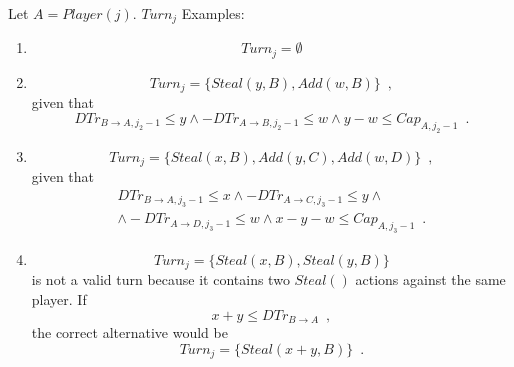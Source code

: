 \documentclass[11pt]{llncs}
\theoremstyle{definition}
\begin{document}
     Let $A = Player(j)$. $Turn_j$ Examples:
     \begin{enumerate}
        \item \begin{equation}
           Turn_j = \emptyset
        \end{equation}
        \item \begin{equation}
           Turn_j = \{Steal\left(y, B\right), Add\left(w, B\right)\} \enspace,
        \end{equation}
        given that
        \begin{equation}
           DTr_{B \rightarrow A, j_2 - 1} \leq y \wedge -DTr_{A \rightarrow B, j_2 - 1} \leq w \wedge y - w \leq
           Cap_{A, j_2-1} \enspace.
        \end{equation}
        \item \begin{equation}
           Turn_j = \{Steal\left(x, B\right), Add\left(y, C\right), Add\left(w, D\right)\} \enspace,
        \end{equation}
        given that
        \begin{equation}
        \begin{gathered}
           DTr_{B \rightarrow A, j_3 - 1} \leq x \wedge -DTr_{A \rightarrow C, j_3-1} \leq y \wedge \\
           \wedge -DTr_{A \rightarrow D, j_3 - 1} \leq w \wedge x - y - w \leq Cap_{A, j_3-1} \enspace.
        \end{gathered}
        \end{equation}
        \item \begin{equation}
           Turn_j = \{Steal\left(x, B\right), Steal\left(y, B\right)\}
        \end{equation}
        is not a valid turn because it contains two $Steal\left(\right)$ actions against the same player. If
        \begin{equation}
           x + y \leq DTr_{B \rightarrow A} \enspace,
        \end{equation}
        the correct alternative would be
        \begin{equation}
           Turn_j = \{Steal\left(x+y, B\right)\} \enspace.
        \end{equation}
     \end{enumerate}
\end{document}
